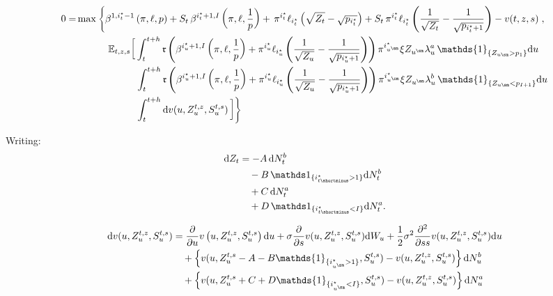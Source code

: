 \documentclass[8pt]{article}
\renewcommand{\d}{\mathrm{d}}
\begin{document}
\begin{equation}
\begin{aligned}
    0 = & \max \left\{ \beta^{1,i^\star_{t} -1} \left(\pi, \ell, p\right) + S_{t}\,\beta^{i^\star_{t}+1, I} \left(\pi, \ell, \frac{1}{p} \right) +\, \pi^{i^\star_{t}} \ell_{i^\star_{t}}\left(\sqrt{Z_{t}}-\sqrt{p_{i^\star_{t}}}\right) + S_{t}\,\pi^{i^\star_{t}} \ell_{i^\star_{t}}\left(\frac{1}{\sqrt{Z_{t}}}-\frac{1}{\sqrt{p_{i^\star_{t} +1}}}\right) - v(t,z,s) \right., \\ 
     & \qquad \quad \left. \mathbb{E}_{t,z,s}\bigg[\int_{t}^{t+h}  \mathfrak{r}\left( \beta^{i^\star_u+1,I} \left(\pi, \ell, \frac{1}{p} \right) + \pi^{i^\star_u} \ell_{i^\star_u}\left(\frac{1}{\sqrt{Z_u}}-\frac{1}{\sqrt{p_{i^\star_u +1}}}\right) \right) \pi^{i^\star_{u^\sm}} \xi Z_{u^\sm} \lambda^a_u \, \mathds{1}_{\{Z_{u\sm} > p_1\}} \d u \bigg. \right.\\
    & \qquad \qquad \qquad \left. \int_t^{t+h} \mathfrak{r}\left(\beta^{i^\star_u+1,I} \left(\pi, \ell, \frac{1}{p} \right) + \pi^{i^\star_u} \ell_{i^\star_u}\left(\frac{1}{\sqrt{Z_u}}-\frac{1}{\sqrt{p_{i^\star_u +1}}}\right)\right) \pi^{i^\star_{u^\sm}} \xi Z_{u^\sm} \lambda^b_u \, \mathds{1}_{\{Z_{u\sm} < p_{I+1}\}} \d u \bigg. \right. \nonumber \\
    & \qquad \qquad \qquad \left. \int_{t}^{t+h} \d v(u, Z^{t, z}_{u}, S^{t, s}_{u}) \, \bigg. \bigg] \right\}
\end{aligned}
\end{equation}

Writing:
\begin{equation}
\begin{aligned}
    \d Z_t &= -A \, \d N^b_t \\
    & \quad  - B \, \mathds 1_{\{i^\star_{t\shortminus} >1\}} \d N^b_t\\
    & \quad  + C \, \d N^a_t\\
    & \quad + D \, \mathds 1_{\{i^\star_{t\shortminus} <I\}}  \d N^a_t.
\end{aligned}
\end{equation}


\begin{equation}
\begin{aligned}
    \d v(u, Z^{t, z}_{u}, S^{t, s}_{u}) &=\frac{\partial}{\partial u} v\left(u,Z_u^{t,z},S_u^{t,s}\right) \d u + \sigma \frac{\partial}{\partial s} v(u,Z_u^{t,z},S_u^{t,s}) \d W_u + \frac{1}{2} \sigma^2 \frac{\partial^2}{\partial ss} v(u,Z_u^{t,z},S_u^{t,s}) \d u \\
    & \quad + \left\{v(u,Z_u^{t,s} - A - B \mathds{1}_{\{i^\star_{u^\sm} > 1\}}, S_u^{t,s}) - v(u,Z_u^{t,z},S_u^{t,s})\right\} \d N^b_u \\
    & \quad + \left\{v(u,Z_u^{t,s} + C + D \mathds{1}_{\{i^\star_{u^\sm} < I\}}, S_u^{t,s}) - v(u,Z_u^{t,z},S_u^{t,s})\right\} \d N^a_u \\
\end{aligned}
\end{equation}
\end{document}
